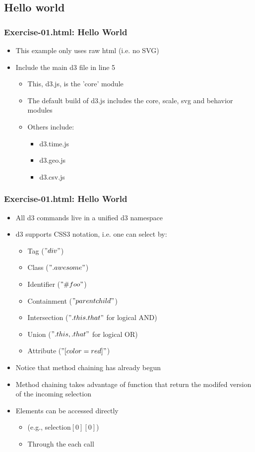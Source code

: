 \documentclass{beamer}
\begin{document}
\subsection{Hello world}

\begin{frame}
    \frametitle{Exercise-01.html: Hello World}
    \begin{itemize}
    \item This example only uses raw html (i.e. no SVG)
    \item Include the main d3 file in line 5
        \begin{itemize}
        \item This, d3.js, is the 'core' module
        \item The default build of d3.js includes the core, scale, svg and behavior modules
        \item Others include:
            \begin{itemize}
            \item d3.time.js
            \item d3.geo.js
            \item d3.csv.js
            \end{itemize}
        \end{itemize}
    \end{itemize}
\end{frame}


\begin{frame}
    \frametitle{Exercise-01.html: Hello World}
    \begin{itemize}
    \item All d3 commands live in a unified d3 namespace
    \item d3 supports CSS3 notation, i.e. one can select by:
        \begin{itemize}
        \item Tag ($"div"$)
        \item Class ($".awesome"$)
        \item Identifier ($"\#foo"$)
        \item Containment ($"parent child"$)
        \item Intersection ($".this.that"$ for logical AND) 
        \item Union ($".this, .that"$ for logical OR)
        \item Attribute ($"[color=red]"$)
        \end{itemize}
    \item Notice that method chaining has already begun
    \item Method chaining takes advantage of function that return the modifed version of the incoming selection
    \item Elements can be accessed directly
        \begin{itemize}
        \item (e.g., selection$[0][0]$)
        \item Through the each call
        \end{itemize}
    \end{itemize}
\end{frame}
\end{document}
